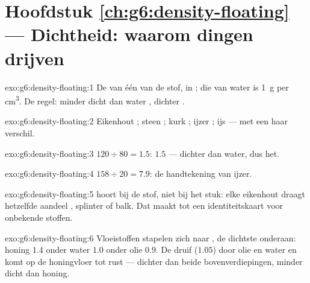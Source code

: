 \section*{Hoofdstuk \ref{ch:g6:density-floating} --- Dichtheid: waarom dingen drijven}

\begin{solution}{exo:g6:density-floating:1}
De  van één  van de stof, in
; die van water is \qty{1}{g} per \unit{cm^3}. De regel: minder
dicht dan water , dichter .
\end{solution}

\begin{solution}{exo:g6:density-floating:2}
Eikenhout ; steen ; kurk ; ijzer
; ijs  --- met een haar verschil.
\end{solution}

\begin{solution}{exo:g6:density-floating:3}
$120 \div 80 = 1.5$:  $1.5$ --- dichter dan water, dus
 het.
\end{solution}

\begin{solution}{exo:g6:density-floating:4}
$158 \div 20 = 7.9$: de handtekening van ijzer.
\end{solution}

\begin{solution}{exo:g6:density-floating:5}
 hoort bij de stof, niet bij het stuk: elke
 eikenhout draagt hetzelfde aandeel ,
splinter of balk. Dat maakt  tot een identiteitskaart voor
onbekende stoffen.
\end{solution}

\begin{solution}{exo:g6:density-floating:6}
Vloeistoffen stapelen zich naar , de dichtste onderaan:
honing $1.4$ onder water $1.0$ onder olie $0.9$. De druif ($1.05$)
 door olie en water en komt op de honingvloer tot rust ---
dichter dan beide bovenverdiepingen, minder dicht dan honing.
\end{solution}

